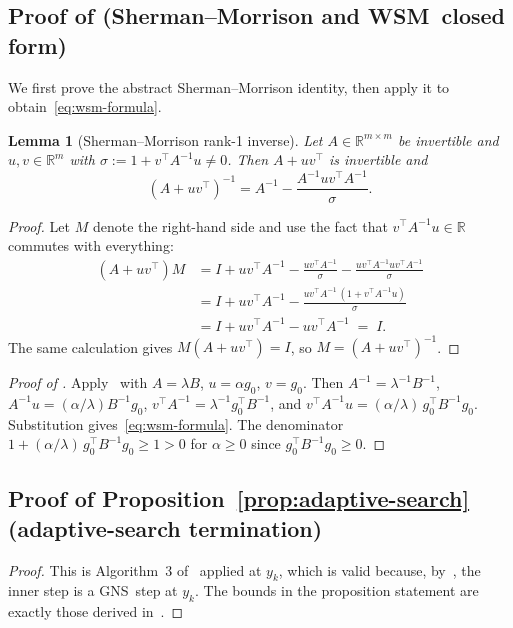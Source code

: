 \documentclass[conference]{IEEEtran}
\newtheorem{lemma}[theorem]{Lemma}
\theoremstyle{remark}
\newcommand{\R}{\mathbb{R}}
\newcommand{\GNS}{\textsc{GNS}}
\newcommand{\WSM}{\textsc{WSM}}
\begin{document}
\subsection{Proof of  (Sherman--Morrison and \WSM\ closed form)}

We first prove the abstract Sherman--Morrison identity, then apply
it to obtain~\eqref{eq:wsm-formula}.

\begin{lemma}[Sherman--Morrison rank-1 inverse]
\label{lem:sm}
Let $A \in \R^{m \times m}$ be invertible and $u, v \in \R^m$ with
$\sigma := 1 + v^\top A^{-1} u \neq 0$. Then $A + uv^\top$ is
invertible and
\[
(A + uv^\top)^{-1} = A^{-1} - \frac{A^{-1} u v^\top A^{-1}}{\sigma}.
\]
\end{lemma}

\begin{proof}
Let $M$ denote the right-hand side and use the fact that $v^\top
A^{-1} u \in \R$ commutes with everything:
\begin{align*}
(A + uv^\top) M
  &= I + uv^\top A^{-1}
    - \tfrac{uv^\top A^{-1}}{\sigma}
    - \tfrac{uv^\top A^{-1} u v^\top A^{-1}}{\sigma} \\
  &= I + uv^\top A^{-1}
    - \tfrac{uv^\top A^{-1}\,(1 + v^\top A^{-1} u)}{\sigma} \\
  &= I + uv^\top A^{-1} - uv^\top A^{-1} \;=\; I.
\end{align*}
The same calculation gives $M(A+uv^\top) = I$, so $M = (A+uv^\top)^{-1}$.
\end{proof}

\begin{proof}[Proof of ]
Apply~ with $A = \lambda B$, $u = \alpha g_0$, $v = g_0$.
Then $A^{-1} = \lambda^{-1} B^{-1}$, $A^{-1} u = (\alpha/\lambda)
B^{-1} g_0$, $v^\top A^{-1} = \lambda^{-1} g_0^\top B^{-1}$, and
$v^\top A^{-1} u = (\alpha/\lambda)\, g_0^\top B^{-1} g_0$.
Substitution gives~\eqref{eq:wsm-formula}. The denominator
$1 + (\alpha/\lambda)\, g_0^\top B^{-1} g_0 \ge 1 > 0$ for $\alpha
\ge 0$ since $g_0^\top B^{-1} g_0 \ge 0$.
\end{proof}

\subsection{Proof of Proposition~\ref{prop:adaptive-search} (adaptive-search termination)}

\begin{proof}
This is Algorithm~3 of~\cite[App.~C]{semenov2025gradient} applied at
$y_k$, which is valid because, by~, the
inner step is a \GNS\ step at $y_k$. The bounds in the
proposition statement are exactly those derived
in~\cite[App.~C]{semenov2025gradient}.
\end{proof}
\end{document}
